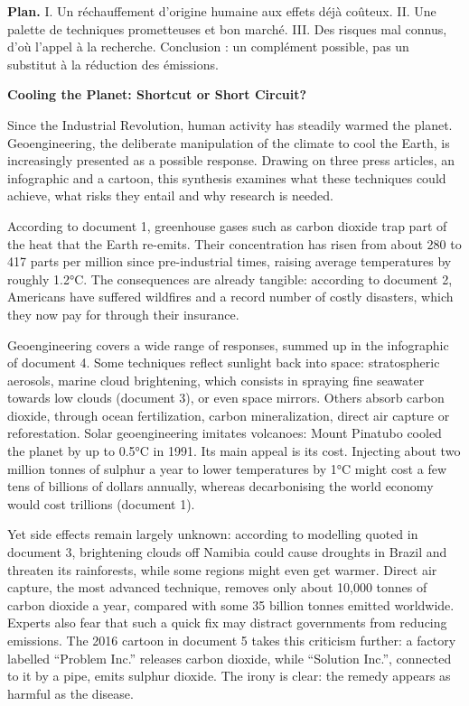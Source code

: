 \documentclass[11pt,a4paper]{article}
\begin{document}
\textbf{Plan.} I. Un réchauffement d'origine humaine aux effets déjà coûteux. II. Une palette de techniques prometteuses et bon marché. III. Des risques mal connus, d'où l'appel à la recherche. Conclusion : un complément possible, pas un substitut à la réduction des émissions.

\textbf{Cooling the Planet: Shortcut or Short Circuit?}

Since the Industrial Revolution, human activity has steadily warmed the planet. Geoengineering, the deliberate manipulation of the climate to cool the Earth, is increasingly presented as a possible response. Drawing on three press articles, an infographic and a cartoon, this synthesis examines what these techniques could achieve, what risks they entail and why research is needed.

According to document 1, greenhouse gases such as carbon dioxide trap part of the heat that the Earth re-emits. Their concentration has risen from about 280 to 417 parts per million since pre-industrial times, raising average temperatures by roughly 1.2°C. The consequences are already tangible: according to document 2, Americans have suffered wildfires and a record number of costly disasters, which they now pay for through their insurance.

Geoengineering covers a wide range of responses, summed up in the infographic of document 4. Some techniques reflect sunlight back into space: stratospheric aerosols, marine cloud brightening, which consists in spraying fine seawater towards low clouds (document 3), or even space mirrors. Others absorb carbon dioxide, through ocean fertilization, carbon mineralization, direct air capture or reforestation. Solar geoengineering imitates volcanoes: Mount Pinatubo cooled the planet by up to 0.5°C in 1991. Its main appeal is its cost. Injecting about two million tonnes of sulphur a year to lower temperatures by 1°C might cost a few tens of billions of dollars annually, whereas decarbonising the world economy would cost trillions (document 1).

Yet side effects remain largely unknown: according to modelling quoted in document 3, brightening clouds off Namibia could cause droughts in Brazil and threaten its rainforests, while some regions might even get warmer. Direct air capture, the most advanced technique, removes only about 10,000 tonnes of carbon dioxide a year, compared with some 35 billion tonnes emitted worldwide. Experts also fear that such a quick fix may distract governments from reducing emissions. The 2016 cartoon in document 5 takes this criticism further: a factory labelled ``Problem Inc.'' releases carbon dioxide, while ``Solution Inc.'', connected to it by a pipe, emits sulphur dioxide. The irony is clear: the remedy appears as harmful as the disease.
\end{document}
